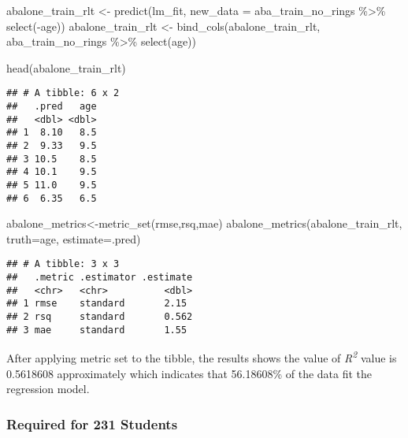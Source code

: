 \documentclass[
]{article}
\newenvironment{Shaded}{\begin{snugshade}}{\end{snugshade}}
\newcommand{\AttributeTok}[1]{\textcolor[rgb]{0.77,0.63,0.00}{#1}}
\newcommand{\FunctionTok}[1]{\textcolor[rgb]{0.00,0.00,0.00}{#1}}
\newcommand{\NormalTok}[1]{#1}
\newcommand{\OtherTok}[1]{\textcolor[rgb]{0.56,0.35,0.01}{#1}}
\newcommand{\SpecialCharTok}[1]{\textcolor[rgb]{0.00,0.00,0.00}{#1}}
\begin{document}
\begin{Shaded}
\begin{Highlighting}[]
\NormalTok{abalone\_train\_rlt }\OtherTok{\textless{}{-}} \FunctionTok{predict}\NormalTok{(lm\_fit, }\AttributeTok{new\_data =}\NormalTok{ aba\_train\_no\_rings }\SpecialCharTok{\%\textgreater{}\%} \FunctionTok{select}\NormalTok{(}\SpecialCharTok{{-}}\NormalTok{age)) }
\NormalTok{abalone\_train\_rlt }\OtherTok{\textless{}{-}} \FunctionTok{bind\_cols}\NormalTok{(abalone\_train\_rlt, aba\_train\_no\_rings }\SpecialCharTok{\%\textgreater{}\%} \FunctionTok{select}\NormalTok{(age))}

\FunctionTok{head}\NormalTok{(abalone\_train\_rlt)                        }
\end{Highlighting}
\end{Shaded}

\begin{verbatim}
## # A tibble: 6 x 2
##   .pred   age
##   <dbl> <dbl>
## 1  8.10   8.5
## 2  9.33   9.5
## 3 10.5    8.5
## 4 10.1    9.5
## 5 11.0    9.5
## 6  6.35   6.5
\end{verbatim}

\begin{Shaded}
\begin{Highlighting}[]
\NormalTok{abalone\_metrics}\OtherTok{\textless{}{-}}\FunctionTok{metric\_set}\NormalTok{(rmse,rsq,mae)}
\FunctionTok{abalone\_metrics}\NormalTok{(abalone\_train\_rlt, }\AttributeTok{truth=}\NormalTok{age,}
                \AttributeTok{estimate=}\NormalTok{.pred)}
\end{Highlighting}
\end{Shaded}

\begin{verbatim}
## # A tibble: 3 x 3
##   .metric .estimator .estimate
##   <chr>   <chr>          <dbl>
## 1 rmse    standard       2.15 
## 2 rsq     standard       0.562
## 3 mae     standard       1.55
\end{verbatim}

After applying metric set to the tibble, the results shows the value of
\emph{R\textsuperscript{2}} value is 0.5618608 approximately which
indicates that 56.18608\% of the data fit the regression model.

\hypertarget{required-for-231-students}{%
\subsubsection{Required for 231
Students}\label{required-for-231-students}}
\end{document}
